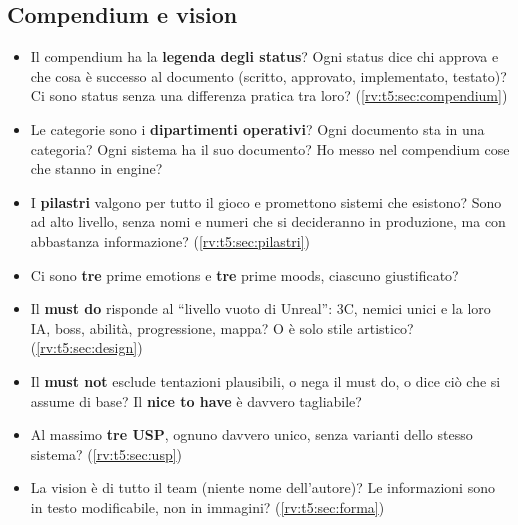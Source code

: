 \subsection{Compendium e vision}
\begin{itemize}
  \item Il compendium ha la \textbf{legenda degli status}? Ogni status dice
        chi approva e che cosa è successo al documento (scritto, approvato,
        implementato, testato)? Ci sono status senza una differenza
        pratica tra loro? (\ref{rv:t5:sec:compendium})
  \item Le categorie sono i \textbf{dipartimenti operativi}? Ogni documento
        sta in una categoria? Ogni sistema ha il suo documento? Ho messo
        nel compendium cose che stanno in engine?
  \item I \textbf{pilastri} valgono per tutto il gioco e promettono sistemi
        che esistono? Sono ad alto livello, senza nomi e numeri che si
        decideranno in produzione, ma con abbastanza informazione?
        (\ref{rv:t5:sec:pilastri})
  \item Ci sono \textbf{tre} prime emotions e \textbf{tre} prime moods,
        ciascuno giustificato?
  \item Il \textbf{must do} risponde al ``livello vuoto di Unreal'': 3C,
        nemici unici e la loro IA, boss, abilità, progressione, mappa? O è
        solo stile artistico? (\ref{rv:t5:sec:design})
  \item Il \textbf{must not} esclude tentazioni plausibili, o nega il must
        do, o dice ciò che si assume di base? Il \textbf{nice to have} è
        davvero tagliabile?
  \item Al massimo \textbf{tre USP}, ognuno davvero unico, senza varianti
        dello stesso sistema? (\ref{rv:t5:sec:usp})
  \item La vision è di tutto il team (niente nome dell'autore)? Le
        informazioni sono in testo modificabile, non in immagini?
        (\ref{rv:t5:sec:forma})
\end{itemize}

